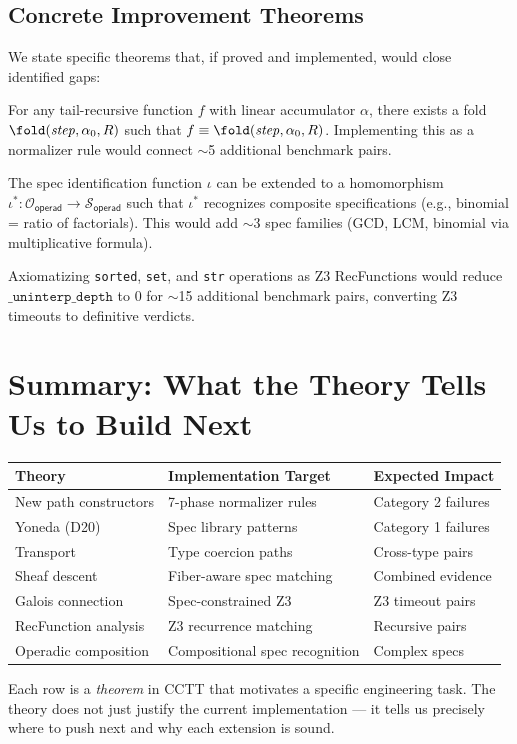 \subsection{Concrete Improvement Theorems}

We state specific theorems that, if proved and implemented,
would close identified gaps:

\begin{conjecture}
\label{conj:accumulator}
For any tail-recursive function $f$ with linear accumulator
$\alpha$, there exists a fold $\fold(\mathit{step}, \alpha_0, R)$
such that $f \equiv \fold(\mathit{step}, \alpha_0, R)$.
Implementing this as a normalizer rule would connect
$\sim$5 additional benchmark pairs.
\end{conjecture}

\begin{conjecture}
\label{conj:comp-spec}
The spec identification function $\iota$ can be extended to a
homomorphism $\iota^* : \mathcal{O}_{\mathsf{operad}} \to
\mathcal{S}_{\mathsf{operad}}$ such that $\iota^*$ recognizes
composite specifications (e.g., binomial = ratio of factorials).
This would add $\sim$3 spec families (GCD, LCM, binomial via
multiplicative formula).
\end{conjecture}

\begin{conjecture}
\label{conj:z3-complete}
Axiomatizing \texttt{sorted}, \texttt{set}, and \texttt{str}
operations as Z3 RecFunctions would reduce
$\texttt{\_uninterp\_depth}$ to 0 for $\sim$15 additional
benchmark pairs, converting Z3 timeouts to definitive verdicts.
\end{conjecture}


\section{Summary: What the Theory Tells Us to Build Next}
\label{sec:fallback-summary}

\begin{center}
\begin{tabular}{lll}
\hline
\textbf{Theory} & \textbf{Implementation Target} & \textbf{Expected Impact} \\
\hline
New path constructors & 7-phase normalizer rules & Category 2 failures \\
Yoneda (D20) & Spec library patterns & Category 1 failures \\
Transport & Type coercion paths & Cross-type pairs \\
Sheaf descent & Fiber-aware spec matching & Combined evidence \\
Galois connection & Spec-constrained Z3 & Z3 timeout pairs \\
RecFunction analysis & Z3 recurrence matching & Recursive pairs \\
Operadic composition & Compositional spec recognition & Complex specs \\
\hline
\end{tabular}
\end{center}

Each row is a \emph{theorem} in CCTT that motivates a specific
engineering task.  The theory does not just justify the current
implementation --- it tells us precisely where to push next and
why each extension is sound.
